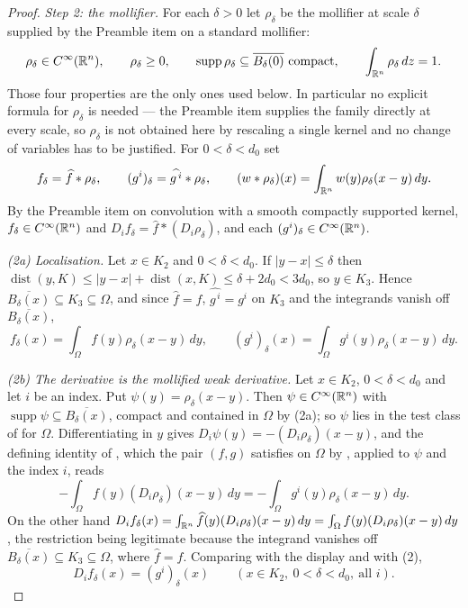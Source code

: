\begin{proof}
\emph{Step 2: the mollifier.}  For each $\delta>0$ let $\rho_\delta$ be the mollifier at scale $\delta$
supplied by the Preamble item on a standard mollifier:
\[
\rho_\delta\in C^\infty(\R^n),\qquad \rho_\delta\ge0,\qquad
\operatorname{supp}\rho_\delta\subseteq\overline{B_\delta(0)}\ \text{compact},
\qquad \int_{\R^n}\rho_\delta\,dz=1 .
\]
Those four properties are the only ones used below.  In particular no explicit
formula for $\rho_\delta$ is needed --- the Preamble item supplies the family
directly at every scale, so $\rho_\delta$ is not obtained here by rescaling a
single kernel and no change of variables has to be justified.  For $0<\delta<d_0$ set
\[
f_\delta=\widehat f*\rho_\delta,\qquad
(g^i)_\delta=\widehat{g^{\,i}}*\rho_\delta,
\qquad
(w*\rho_\delta)(x)=\int_{\mathbb{R}^n}w(y)\rho_\delta(x-y)\,dy .
\]
By the Preamble item on convolution with a smooth compactly supported kernel,
$f_\delta\in C^\infty(\mathbb{R}^n)$ and $D_if_\delta=\widehat f*(D_i\rho_\delta)$, and
each $(g^i)_\delta\in C^\infty(\mathbb{R}^n)$.

\emph{(2a) Localisation.}  Let $x\in K_2$ and $0<\delta<d_0$.  If
$|y-x|\le\delta$ then
$\operatorname{dist}(y,K)\le|y-x|+\operatorname{dist}(x,K)\le\delta+2d_0<3d_0$,
so $y\in K_3$.  Hence $\overline{B_\delta(x)}\subseteq K_3\subseteq\Omega$, and
since $\widehat f=f$, $\widehat{g^{\,i}}=g^i$ on $K_3$ and the integrands vanish
off $\overline{B_\delta(x)}$,
\[
f_\delta(x)=\int_\Omega f(y)\rho_\delta(x-y)\,dy,
\qquad
(g^i)_\delta(x)=\int_\Omega g^i(y)\rho_\delta(x-y)\,dy .
\tag{2}
\]

\emph{(2b) The derivative is the mollified weak derivative.}  Let $x\in K_2$,
$0<\delta<d_0$ and let $i$ be an index.  Put $\psi(y)=\rho_\delta(x-y)$.  Then
$\psi\in C^\infty(\mathbb{R}^n)$ with
$\operatorname{supp}\psi\subseteq\overline{B_\delta(x)}$, compact and contained
in $\Omega$ by (2a); so $\psi$ lies in the test class of
 for $\Omega$.  Differentiating in $y$ gives
$D_i\psi(y)=-(D_i\rho_\delta)(x-y)$, and the defining identity of
, which the pair $(f,g)$ satisfies on $\Omega$ by
, applied to $\psi$ and the index $i$, reads
\[
-\int_\Omega f(y)(D_i\rho_\delta)(x-y)\,dy
=-\int_\Omega g^i(y)\rho_\delta(x-y)\,dy .
\]
On the other hand
$D_if_\delta(x)=\int_{\mathbb{R}^n}\widehat f(y)(D_i\rho_\delta)(x-y)\,dy
=\int_\Omega f(y)(D_i\rho_\delta)(x-y)\,dy$, the restriction being legitimate
because the integrand vanishes off $\overline{B_\delta(x)}\subseteq
K_3\subseteq\Omega$, where $\widehat f=f$.  Comparing with the display and with
(2),
\[
D_if_\delta(x)=(g^i)_\delta(x)\qquad(x\in K_2,\ 0<\delta<d_0,\ \text{all }i).
\tag{3}
\]


\end{proof}
